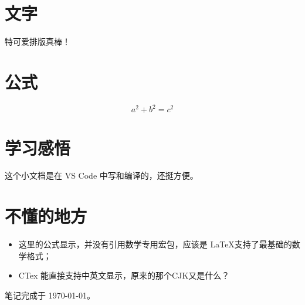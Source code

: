 \documentclass[UTF8]{ctexart}
\begin{document}
    \section{文字}
    特可爱排版真棒！

    \section{公式}
    \[
     a ^2 + b^2 = c^2   
    \]

    \section{学习感悟}
    这个小文档是在 VS Code 中写和编译的，还挺方便。

    \section{不懂的地方}
    \begin{itemize}
        \item 这里的公式显示，并没有引用数学专用宏包，应该是 \LaTeX 支持了最基础的数学格式；
        \item CTex 能直接支持中英文显示，原来的那个CJK又是什么？
    \end{itemize}

    笔记完成于 \today 。
    
\end{document}
